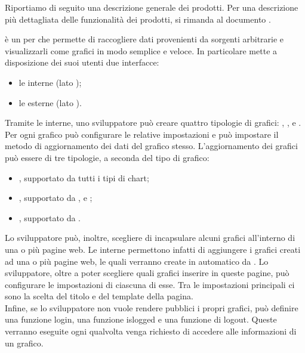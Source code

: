     Riportiamo di seguito una descrizione generale dei prodotti. Per una descrizione più dettagliata delle funzionalità dei prodotti, si rimanda al documento .

         è un  per  che permette di raccogliere dati provenienti da sorgenti arbitrarie e visualizzarli come grafici in modo semplice e veloce. In particolare mette a disposizione dei suoi utenti due interfacce:
        \begin{itemize}
            \item le  interne (lato );
            \item le  esterne (lato ).
        \end{itemize}
        
        Tramite le  interne, uno sviluppatore può creare quattro tipologie di grafici: , ,  e . Per ogni grafico può configurare le relative impostazioni e può impostare il metodo di aggiornamento dei dati del grafico stesso. L'aggiornamento dei grafici può essere di tre tipologie, a seconda del tipo di grafico:
        \begin{itemize}
            \item {}, supportato da tutti i tipi di chart;
            \item {}, supportato da ,  e ;
            \item {}, supportato da .
        \end{itemize}
        
        Lo sviluppatore può, inoltre, scegliere di incapsulare alcuni grafici all'interno di una o più pagine web. Le  interne permettono infatti di aggiungere i grafici creati ad una o più pagine web, le quali verranno create in automatico da . Lo sviluppatore, oltre a poter scegliere quali grafici inserire in queste pagine, può configurare le impostazioni di ciascuna di esse. Tra le impostazioni principali ci sono la scelta del titolo e del template della pagina.\\
        Infine, se lo sviluppatore non vuole rendere pubblici i propri grafici, può definire una funzione login, una funzione islogged e una funzione di logout. Queste verranno eseguite ogni qualvolta venga richiesto di accedere alle informazioni di un grafico.
       
